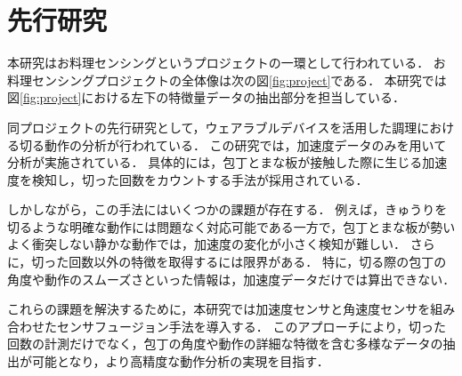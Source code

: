 \section{先行研究}
本研究はお料理センシングというプロジェクトの一環として行われている．
お料理センシングプロジェクトの全体像は次の図\ref{fig:project}である．
本研究では図\ref{fig:project}における左下の特徴量データの抽出部分を担当している．

同プロジェクトの先行研究として，ウェアラブルデバイスを活用した調理における切る動作の分析が行われている\cite{kumazawaanalysis}．
この研究では，加速度データのみを用いて分析が実施されている．
具体的には，包丁とまな板が接触した際に生じる加速度を検知し，切った回数をカウントする手法が採用されている．

しかしながら，この手法にはいくつかの課題が存在する．
例えば，きゅうりを切るような明確な動作には問題なく対応可能である一方で，包丁とまな板が勢いよく衝突しない静かな動作では，加速度の変化が小さく検知が難しい．
さらに，切った回数以外の特徴を取得するには限界がある．
特に，切る際の包丁の角度や動作のスムーズさといった情報は，加速度データだけでは算出できない．

これらの課題を解決するために，本研究では加速度センサと角速度センサを組み合わせたセンサフュージョン手法を導入する．
このアプローチにより，切った回数の計測だけでなく，包丁の角度や動作の詳細な特徴を含む多様なデータの抽出が可能となり，より高精度な動作分析の実現を目指す．

